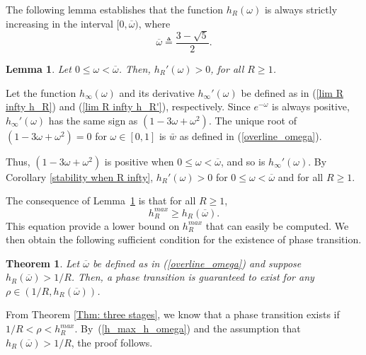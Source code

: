 \documentclass{IEEEtran}
\newtheorem{lemma}{Lemma}
\newtheorem{theorem}{Theorem}
\begin{document}
The following lemma establishes that the function $h_R(\omega)$ is always strictly increasing in the interval $[0, \overline{\omega})$, where
\begin{equation}\label{overline_omega}
\overline{\omega} \triangleq \frac{3-\sqrt{5}}{2}.
\end{equation}
\begin{lemma}
\label{stable fixed point}
Let $0 \leq \omega<\overline{\omega}$. Then, $h_R'(\omega)>0$, for all $R \geq 1$.
\end{lemma}
\begin{IEEEproof}
Let the function $h_\infty(\omega)$ and its derivative $h_\infty'(\omega)$ be defined as in (\ref{lim R infty h_R}) and (\ref{lim R infty h_R'}),
respectively.
Since $e^{-\omega}$ is always positive, $h_\infty'(\omega)$ has the same sign as $(1-3\omega+\omega^2)$.
The unique root of $(1-3\omega+\omega^2)=0$ for $\omega \in [0,1]$ is $\bar{w}$ as defined in (\ref{overline_omega}).

Thus, $(1-3\omega+\omega^2)$ is positive when $0 \leq \omega<\overline{\omega}$,
and so is $h_\infty'(\omega)$. By Corollary \ref{stability when R infty}, $h_R'(\omega)>0$ for $0 \leq \omega<\overline{\omega}$ and for all $R \geq
1$.

\end{IEEEproof}


The consequence of Lemma~\ref{stable fixed point} is that for all $R \geq 1$,
\begin{equation} \label{h_max_h_omega}
h^{max}_R \geq h_R(\overline{\omega}).
\end{equation}
This equation provide a lower bound on $h^{max}_R$ that can easily be computed. We then obtain the following sufficient condition for the existence
of phase transition.

\begin{theorem}
\label{Thm:range of lambda T}
Let $\overline{\omega}$ be defined as in (\ref{overline_omega}) and suppose $h_R(\overline{\omega})> 1/R$. Then, a phase transition is guaranteed to
exist for any $\rho \in (1/R, h_R(\overline{\omega}))$.
\end{theorem}
\begin{IEEEproof}
From Theorem \ref{Thm: three stages}, we know that a phase transition exists if $1/R < \rho< h^{max}_R$. By~(\ref{h_max_h_omega}) and the assumption
that $h_R(\overline{\omega})> 1/R$, the proof follows.
\end{IEEEproof}
\end{document}
